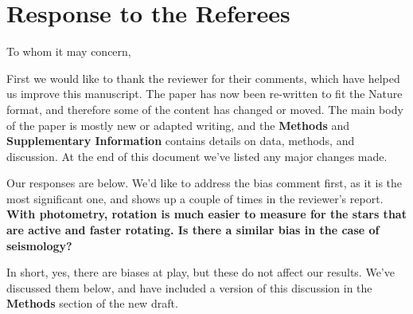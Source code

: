 \documentclass[11pt]{article}
\begin{document}
	
\section*{Response to the Referees}

To whom it may concern,

First we would like to thank the reviewer for their comments, which have helped us improve this manuscript. The paper has now been re-written to fit the Nature format, and therefore some of the content has changed or moved. The main body of the paper is mostly new or adapted writing, and the \textbf{Methods} and \textbf{Supplementary Information} contains details on data, methods, and discussion. At the end of this document we’ve listed any major changes made.

Our responses are below. We’d like to address the bias comment first, as it is the most significant one, and shows up a couple of times in the reviewer’s report. \\

\noindent \textbf{With photometry, rotation is much easier to measure for the stars that are active and faster rotating. Is there a similar bias in the case of seismology? }

In short, yes, there are biases at play, but these do not affect our results. We’ve discussed them below, and have included a version of this discussion in the \textbf{Methods} section of the new draft.
\end{document}
